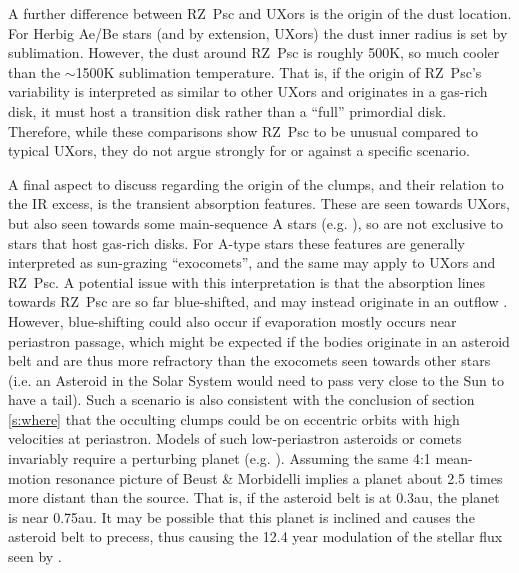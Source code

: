 \documentclass[]{rsos}
\begin{document}
A further difference between RZ~Psc and UXors is the origin of the dust location. For
Herbig Ae/Be stars (and by extension, UXors) the dust inner radius is set by
sublimation. However, the dust around RZ~Psc is roughly 500K, so much cooler than the
$\sim$1500K sublimation temperature. That is, if the origin of RZ~Psc's variability is
interpreted as similar to other UXors and originates in a gas-rich disk, it must host a
transition disk rather than a ``full'' primordial disk. Therefore, while these
comparisons show RZ~Psc to be unusual compared to typical UXors, they do not argue
strongly for or against a specific scenario.

A final aspect to discuss regarding the origin of the clumps, and their relation to the
IR excess, is the transient absorption features. These are seen towards UXors, but also
seen towards some main-sequence A stars
(e.g. \cite{1987A&A...185..267F,2013PASP..125..759W,2014A&A...561L..10K}), so are not
exclusive to stars that host gas-rich disks. For A-type stars these features are
generally interpreted as sun-grazing ``exocomets'', and the same may apply to UXors and
RZ~Psc. A potential issue with this interpretation is that the absorption lines towards
RZ~Psc are so far blue-shifted, and may instead originate in an outflow
\cite{2013Ap.....56..453P}. However, blue-shifting could also occur if evaporation mostly
occurs near periastron passage, which might be expected if the bodies originate in an
asteroid belt and are thus more refractory than the exocomets seen towards other stars
(i.e. an Asteroid in the Solar System would need to pass very close to the Sun to have a
tail). Such a scenario is also consistent with the conclusion of section \ref{s:where}
that the occulting clumps could be on eccentric orbits with high velocities at
periastron. Models of such low-periastron asteroids or comets invariably require a
perturbing planet (e.g. \cite{1990A&A...236..202B,1996Icar..120..358B}). Assuming the
same 4:1 mean-motion resonance picture of Beust \& Morbidelli \cite{1996Icar..120..358B}
implies a planet about 2.5 times more distant than the source. That is, if the asteroid
belt is at 0.3au, the planet is near 0.75au. It may be possible that this planet is
inclined and causes the asteroid belt to precess, thus causing the 12.4 year modulation
of the stellar flux seen by \cite{2013A&A...553L...1D}.
\end{document}
